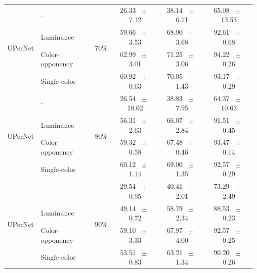 \begin{table}[h]
\begin{tabular}{@{}l l c c c c@{}}
    \multirow{4}{*}{UPerNet} & - & \multirow{4}{*}{70\%} & 26.33 ~$\pm$~ 7.12 & 38.14 ~$\pm$~ 6.71 & 65.08 ~$\pm$~ 13.53 \\
    & Luminance &  & 59.66 ~$\pm$~ 3.53 & 68.90 ~$\pm$~ 3.68 & 92.61 ~$\pm$~ 0.68 \\
    & Color-opponency &  & 62.99 ~$\pm$~ 3.01 & 71.25 ~$\pm$~ 3.06 & 94.22 ~$\pm$~ 0.26 \\
    & Single-color &  & 60.92 ~$\pm$~ 0.63 & 70.05 ~$\pm$~ 1.43 & 93.17 ~$\pm$~ 0.29 \\
    \midrule
    \multirow{4}{*}{UPerNet} & - & \multirow{4}{*}{80\%} & 26.54 ~$\pm$~ 10.02 & 38.83 ~$\pm$~ 7.95 & 64.37 ~$\pm$~ 10.63 \\
    & Luminance &  & 56.31 ~$\pm$~ 2.63 & 66.07 ~$\pm$~ 2.84 & 91.51 ~$\pm$~ 0.45 \\
    & Color-opponency &  & 59.32 ~$\pm$~ 0.58 & 67.48 ~$\pm$~ 0.46 & 93.47 ~$\pm$~ 0.14 \\
    & Single-color &  & 60.12 ~$\pm$~ 1.14 & 69.00 ~$\pm$~ 1.35 & 92.57 ~$\pm$~ 0.29 \\
    \midrule
    \multirow{4}{*}{UPerNet} & - & \multirow{4}{*}{90\%} & 29.54 ~$\pm$~ 0.95 & 40.41 ~$\pm$~ 2.01 & 73.29 ~$\pm$~ 2.49 \\
    & Luminance &  & 49.14 ~$\pm$~ 0.72 & 58.79 ~$\pm$~ 2.34 & 88.53 ~$\pm$~ 0.23 \\
    & Color-opponency &  & 59.10 ~$\pm$~ 3.33 & 67.97 ~$\pm$~ 4.00 & 92.57 ~$\pm$~ 0.25 \\
    & Single-color &  & 53.51 ~$\pm$~ 0.83 & 63.21 ~$\pm$~ 1.34 & 90.20 ~$\pm$~ 0.26 \\
    \midrule
    \bottomrule
  \end{tabular}
  \label{tab:upernet_cityscapes}
\end{table}